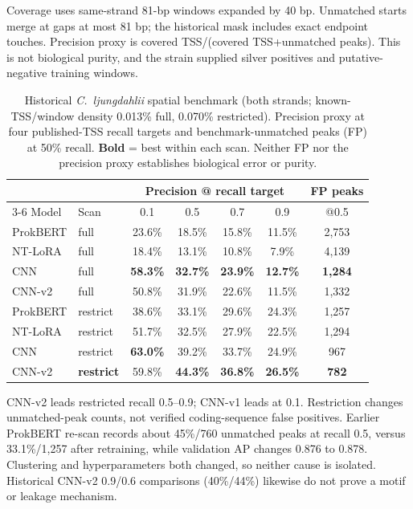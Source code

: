 \documentclass{article}
\begin{document}
Coverage uses same-strand 81-bp windows expanded by 40 bp. Unmatched starts merge at gaps at most 81 bp; the historical mask includes exact endpoint touches. Precision proxy is covered TSS/(covered TSS+unmatched peaks). This is not biological purity, and the strain supplied silver positives and putative-negative training windows.

\begin{table}[h]
\centering
\small
\caption{Historical \emph{C.\ ljungdahlii} spatial benchmark (both strands; known-TSS/window density 0.013\% full, 0.070\% restricted). Precision proxy at four published-TSS recall targets and benchmark-unmatched peaks (FP) at 50\% recall. \textbf{Bold} = best within each scan. Neither FP nor the precision proxy establishes biological error or purity.}
\begin{tabular}{llccccc}
\toprule
 & & \multicolumn{4}{c}{Precision @ recall target} & FP peaks \\
\cmidrule(lr){3-6}
Model & Scan & 0.1 & 0.5 & 0.7 & 0.9 & @0.5 \\
\midrule
ProkBERT & full              & 23.6\% & 18.5\% & 15.8\% & 11.5\% & 2{,}753 \\
NT-LoRA  & full              & 18.4\% & 13.1\% & 10.8\% & 7.9\%  & 4{,}139 \\
CNN      & full              & \textbf{58.3\%} & \textbf{32.7\%} & \textbf{23.9\%} & \textbf{12.7\%} & \textbf{1{,}284} \\
CNN-v2   & full              & 50.8\% & 31.9\% & 22.6\% & 11.5\% & 1{,}332 \\
\midrule
ProkBERT & restrict          & 38.6\% & 33.1\% & 29.6\% & 24.3\% & 1{,}257 \\
NT-LoRA  & restrict          & 51.7\% & 32.5\% & 27.9\% & 22.5\% & 1{,}294 \\
CNN      & restrict          & \textbf{63.0\%} & 39.2\% & 33.7\% & 24.9\% & 967 \\
CNN-v2   & \textbf{restrict} & 59.8\% & \textbf{44.3\%} & \textbf{36.8\%} & \textbf{26.5\%} & \textbf{782} \\
\bottomrule
\end{tabular}
\end{table}

CNN-v2 leads restricted recall 0.5--0.9; CNN-v1 leads at 0.1. Restriction changes unmatched-peak counts, not verified coding-sequence false positives. Earlier ProkBERT re-scan records about 45\%/760 unmatched peaks at recall 0.5, versus 33.1\%/1,257 after retraining, while validation AP changes 0.876 to 0.878. Clustering and hyperparameters both changed, so neither cause is isolated. Historical CNN-v2 0.9/0.6 comparisons (40\%/44\%) likewise do not prove a motif or leakage mechanism.
\end{document}
